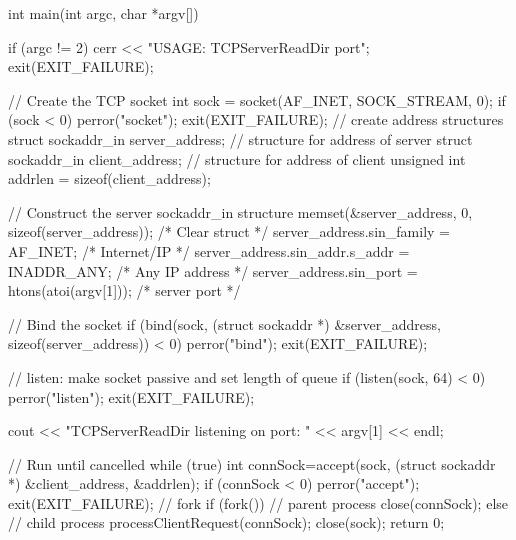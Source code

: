 \documentclass{report}
\begin{document}
    \pagebreak 
    \begin{cppcode}
int main(int argc, char *argv[]) {

	if (argc != 2) {
		cerr << "USAGE: TCPServerReadDir port\n";
		exit(EXIT_FAILURE);
	}
	
	// Create the TCP socket 
	int sock = socket(AF_INET, SOCK_STREAM, 0);
	if (sock < 0) {
		perror("socket");
		exit(EXIT_FAILURE);
	}	
	// create address structures
	struct sockaddr_in server_address;  // structure for address of server
	struct sockaddr_in client_address;  // structure for address of client
	unsigned int addrlen = sizeof(client_address);	

	// Construct the server sockaddr_in structure 
	memset(&server_address, 0, sizeof(server_address));   /* Clear struct */
	server_address.sin_family = AF_INET;                  /* Internet/IP */
	server_address.sin_addr.s_addr = INADDR_ANY;          /* Any IP address */
	server_address.sin_port = htons(atoi(argv[1]));       /* server port */

	// Bind the socket
	if (bind(sock, (struct sockaddr *) &server_address, sizeof(server_address)) < 0) {
		perror("bind");
		exit(EXIT_FAILURE);
	}	
	
	// listen: make socket passive and set length of queue
	if (listen(sock, 64) < 0) {
		perror("listen");
		exit(EXIT_FAILURE);
	}
	
	cout << "TCPServerReadDir listening on port: " << argv[1] << endl;

	// Run until cancelled 
	while (true) {
		int connSock=accept(sock, (struct sockaddr *) &client_address, &addrlen);
		if (connSock < 0) {
			perror("accept");
			exit(EXIT_FAILURE);
		}
		// fork
		if (fork()) { 	    // parent process
			close(connSock);
		} else { 			// child process
			processClientRequest(connSock);
		}
	}	
	close(sock);
	return 0;
} 
    \end{cppcode}

    
\end{document}

